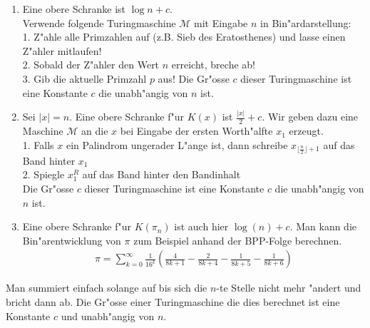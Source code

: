 \documentclass[10pt,oneside,onecolumn,a4paper,german,titlepage]{article}
\begin{document}
\begin{enumerate}
\item Eine obere Schranke ist $\log n + c$.\\
Verwende folgende Turingmaschine $\mathcal{M}$ mit Eingabe $n$ in Bin"ardarstellung:\\
1. Z"ahle alle Primzahlen auf (z.B. Sieb des Eratosthenes) und lasse einen Z"ahler
mitlaufen!\\
2. Sobald der Z"ahler den Wert $n$ erreicht, breche ab!\\
3. Gib die aktuelle Primzahl $p$ aus!
Die Gr"osse $c$ dieser Turingmaschine ist eine Konstante $c$ die unabh"angig von $n$ ist.

\item Sei $|x| = n$. Eine obere Schranke f"ur $K(x)$ ist $\frac{|x|}{2} + c$. Wir geben dazu eine Maschine $\mathcal{M}$ an die $x$ bei Eingabe der ersten Worth"alfte $x_1$ erzeugt.\\
1. Falls $x$ ein Palindrom ungerader L"ange ist, dann schreibe $x_{\lfloor \frac{n}{2} \rfloor + 1}$ auf das Band hinter $x_1$\\
2. Spiegle $x_1^R$ auf das Band hinter den Bandinhalt\\
Die Gr"osse $c$ dieser Turingmaschine ist eine Konstante $c$ die unabh"angig von $n$ ist.
\item Eine obere Schranke f"ur $K(\pi_n)$ ist auch hier $\log(n) + c$. Man kann die Bin"arentwicklung von $\pi$ zum Beispiel anhand der BPP-Folge berechnen.
\begin{align*}
\pi = \sum_{k = 0}^\infty {\frac{1}{16^k}\left( \frac{4}{8k + 1} - \frac{2}{8k + 4} - \frac{1}{8k + 5} - \frac{1}{8k + 6}\right)}
\end{align*}
\end{enumerate}
Man summiert einfach solange auf bis sich die $n$-te Stelle nicht mehr "andert und bricht dann ab. Die Gr"osse einer Turingmaschine die dies berechnet ist eine Konstante $c$ und unabh"angig von $n$.
\end{document}
